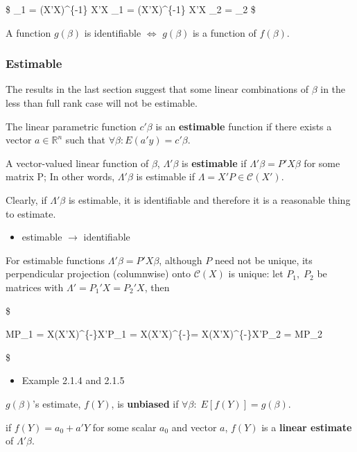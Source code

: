 \documentclass[
]{book}
\providecommand{\tightlist}{%
  \setlength{\itemsep}{0pt}\setlength{\parskip}{0pt}}
\begin{document}
{{{\$
\beta\_1 = (X'X)\^{}\{-1\} X'X \beta\_1 = (X'X)\^{}\{-1\} X'X \beta\_2 = \beta\_2
\$

A function \(g(\beta)\) is identifiable \(\iff\) \(g(\beta)\) is a function of \(f(\beta)\).

\hypertarget{estimable}{%
\subsubsection{Estimable}\label{estimable}}

The results in the last section suggest that some linear combinations of \(\beta\) in the less than full rank case will not be estimable.

The linear parametric function \(c'β\) is an \textbf{estimable} function if there exists a vector \(a \in \mathbb{R}^n\) such that \(\forall \beta: E(a ' y ) = c ' \beta\).

A vector-valued linear function of \(\beta\), \(\Lambda ' \beta\) is \textbf{estimable} if \(\Lambda ' \beta = P ' X \beta\) for some matrix P; In other words, \(\Lambda ' \beta\) is estimable if \(\Lambda = X ' P \in \mathcal{C}(X')\).

Clearly, if \(\Lambda ' \beta\) is estimable, it is identifiable and therefore it is a reasonable thing to estimate.

\begin{itemize}
\tightlist
\item
  estimable \(\rightarrow\) identifiable
\end{itemize}

For estimable functions \(\Lambda' \beta = P ' X \beta\), although \(P\) need not be unique, its perpendicular projection (columnwise) onto \(\mathcal{C}(X)\) is unique:
let \(P_1 , \; P_2\) be matrices with \(\Lambda ' = P_1 ' X = P_2 ' X\), then

\$

MP\_1 = X(X'X)\^{}\{-\}X'P\_1 = X(X'X)\^{}\{-\}\Lambda = X(X'X)\^{}\{-\}X'P\_2 = MP\_2

\$

\begin{itemize}
\tightlist
\item
  Example 2.1.4 and 2.1.5
\end{itemize}

\(g(\beta)\)'s estimate, \(f(Y)\), is \textbf{unbiased} if \(\forall \beta: \; E[f(Y)] = g(\beta)\).

if \(f (Y) = a_0 + a' Y\) for some scalar \(a_0\) and vector \(a\), \(f(Y)\) is a \textbf{linear estimate} of \(\Lambda ' \beta\).

}}}
\end{document}
